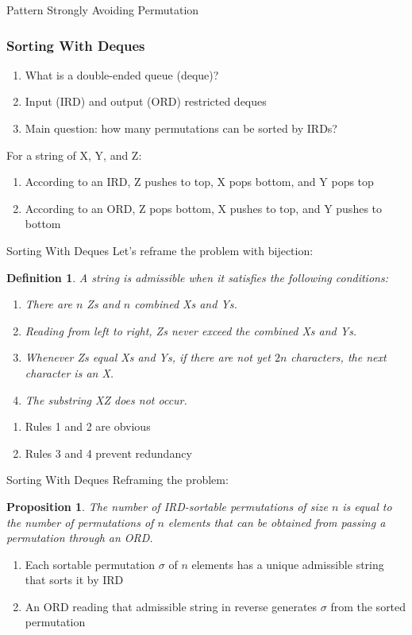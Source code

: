 \documentclass{beamer}  %
\newtheorem{prop}{Proposition}
\newtheorem{defn}{Definition}
\begin{document}
\begin{frame}{Pattern Strongly Avoiding Permutation}
    \frametitle{Sorting With Deques}
    \begin{enumerate}
        \item What is a double-ended queue (deque)?
        \item Input (IRD) and output (ORD) restricted deques
        \item Main question: how many permutations can be sorted by IRDs?
    \end{enumerate}

    For a string of X, Y, and Z:
    \begin{enumerate}
        \item According to an IRD, Z pushes to top, X pops bottom, and Y pops top
        \item According to an ORD, Z pops bottom, X pushes to top, and Y pushes to bottom
    \end{enumerate}
    
\end{frame}

\begin{frame}{Sorting With Deques}
Let's reframe the problem with bijection:
    \begin{defn}
        A string is admissible when it satisfies the following conditions:
        \begin{enumerate}
            \item There are $n$ Zs and $n$ combined Xs and Ys.
            \item Reading from left to right, Zs never exceed the combined Xs and Ys.
            \item Whenever Zs equal Xs and Ys, if there are not yet $2n$ characters, the next character is an X.
            \item The substring XZ does not occur.
        \end{enumerate}
    \end{defn}
    \begin{enumerate}
        \item Rules 1 and 2 are obvious
        \item Rules 3 and 4 prevent redundancy
    \end{enumerate}

    
\end{frame}

\begin{frame}{Sorting With Deques}
    Reframing the problem:
    \begin{prop}
        The number of IRD-sortable permutations of size $n$ is equal to the number of permutations of $n$ elements that can be obtained from passing a permutation through an ORD.
    \end{prop}
    \begin{enumerate}
        \item Each sortable permutation $\sigma$ of $n$ elements has a unique admissible string that sorts it by IRD
        \item An ORD reading that admissible string in reverse generates $\sigma$ from the sorted permutation
    \end{enumerate}
\end{frame}
\end{document}
